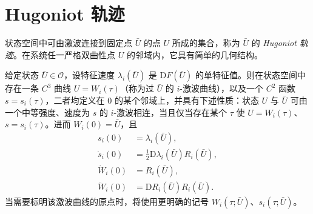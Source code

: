 \documentclass[../../main.tex]{subfiles}
\begin{document}
\section{Hugoniot 轨迹}\label{section:ch08-hugoniot轨迹}

状态空间中可由激波连接到固定点 $\bar U$ 的点 $U$ 所成的集合，称为 $\bar U$ 的 \emph{Hugoniot 轨迹}。在系统任一严格双曲性点 $U$ 的邻域内，它具有简单的几何结构。

\begin{theorem}[激波曲线]\label{theorem:ch08-激波曲线}
给定状态 $\bar U\in\mathcal O$，设特征速度 $\lambda_i(\bar U)$ 是 $\mathrm{D}F(\bar U)$ 的单特征值。则在状态空间中存在一条 $C^3$ 曲线 $U=W_i(\tau)$（称为过 $\bar U$ 的 $i$-激波曲线），以及一个 $C^2$ 函数 $s=s_i(\tau)$，二者均定义在 $0$ 的某个邻域上，并具有下述性质：状态 $U$ 与 $\bar U$ 可由一个中等强度、速度为 $s$ 的 $i$-激波相连，当且仅当存在某个 $\tau$ 使 $U=W_i(\tau)$、$s=s_i(\tau)$。进而 $W_i(0)=\bar U$，且
\begin{align}
s_i(0)&=\lambda_i(\bar U),
\label{align:ch08-si0}\\
\dot s_i(0)&=\tfrac12\mathrm{D}\lambda_i(\bar U)R_i(\bar U),
\label{align:ch08-sdot}\\
\dot W_i(0)&=R_i(\bar U),
\label{align:ch08-wdot}\\
\ddot W_i(0)&=\mathrm{D}R_i(\bar U)R_i(\bar U).
\label{align:ch08-wddot}
\end{align}
当需要标明该激波曲线的原点时，将使用更明确的记号 $W_i(\tau;\bar U)$、$s_i(\tau;\bar U)$。
\end{theorem}
\end{document}
